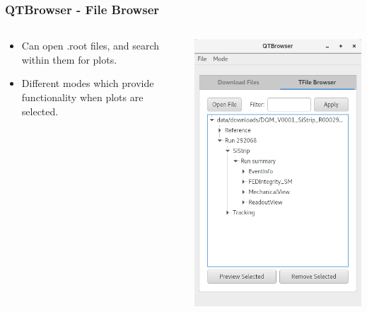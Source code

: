 \documentclass{beamer}
\begin{document}
\begin{frame}
\frametitle{QTBrowser - File Browser}
  \begin{columns}[T]
    \begin{column}{.5\textwidth}
     \begin{block}{}
     \begin{itemize}
     \item Can open .root files, and search within them for plots.
     \item Different modes which provide functionality when plots are selected.
     \end{itemize}
    	\end{block}	
    \end{column}
    \begin{column}{.5\textwidth}
    \begin{block}{}
    \includegraphics[width=.7\textwidth]{figures/browser_view.png}
    \end{block}
    \end{column}
  \end{columns}
\end{frame}
\end{document}
